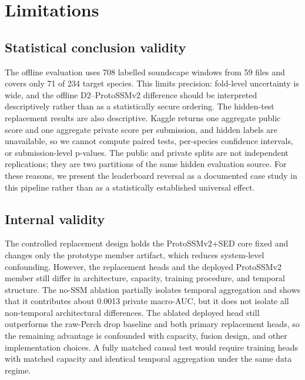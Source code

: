 \documentclass{ceurart}
\begin{document}
\section{Limitations}
\label{sec:limitations}

\subsection{Statistical conclusion validity}

The offline evaluation uses 708 labelled soundscape windows from 59 files and covers only 71 of 234 target species.
This limits precision: fold-level uncertainty is wide, and the offline D2--ProtoSSMv2 difference should be interpreted descriptively rather than as a statistically secure ordering.
The hidden-test replacement results are also descriptive.
Kaggle returns one aggregate public score and one aggregate private score per submission, and hidden labels are unavailable, so we cannot compute paired tests, per-species confidence intervals, or submission-level p-values.
The public and private splits are not independent replications; they are two partitions of the same hidden evaluation source.
For these reasons, we present the leaderboard reversal as a documented case study in this pipeline rather than as a statistically established universal effect.

\subsection{Internal validity}

The controlled replacement design holds the ProtoSSMv2+SED core fixed and changes only the prototype member artifact, which reduces system-level confounding.
However, the replacement heads and the deployed ProtoSSMv2 member still differ in architecture, capacity, training procedure, and temporal structure.
The no-SSM ablation partially isolates temporal aggregation and shows that it contributes about 0.0013 private macro-AUC, but it does not isolate all non-temporal architectural differences.
The ablated deployed head still outperforms the raw-Perch drop baseline and both primary replacement heads, so the remaining advantage is confounded with capacity, fusion design, and other implementation choices.
A fully matched causal test would require training heads with matched capacity and identical temporal aggregation under the same data regime.
\end{document}
